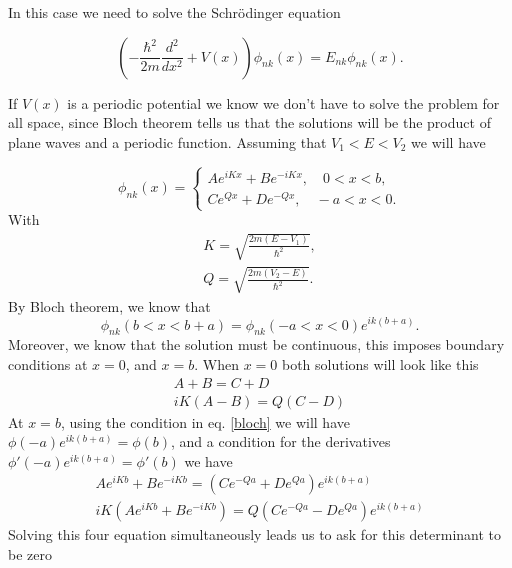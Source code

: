 
\begin{questions}
\begin{solution}
  In this case we need to solve the Schrödinger equation

  \begin{equation}
    \left(-\frac{\hbar^2}{2m}\frac{d^2}{dx^2} + V(x)\right)\phi_{nk}(x) = E_{nk}\phi_{nk}(x).
  \end{equation}

  If $V(x)$ is a periodic potential we know we don't have to solve the problem for all space, since Bloch theorem tells us that the solutions will be the product of plane waves and a periodic function. Assuming that $V_1<E<V_2$ we will have

  \begin{equation}
    \phi_{nk}(x) = \begin{cases}
      Ae^{iKx} + Be^{-iKx}, \quad 0<x<b,\\
      Ce^{Qx} + De^{-Qx}, \quad -a < x < 0.
  \end{cases}
  \end{equation}
  With
  \begin{eqnarray}
    K = \sqrt{\frac{2m(E-V_1)}{\hbar^2}},\\
    Q = \sqrt{\frac{2m(V_2-E)}{\hbar^2}}.
  \end{eqnarray}
  By Bloch theorem, we know that
  \begin{equation}
    \phi_{nk}(b<x<b+a) = \phi_{nk}(-a<x<0)e^{ik(b+a)}.
    \label{bloch}
  \end{equation}
  Moreover, we know that the solution must be continuous, this imposes boundary conditions at $x=0$, and $x=b$.
  When $x=0$ both solutions will look like this
  \begin{eqnarray}
    A+B = C+D\\
    iK(A-B) = Q(C-D)
  \end{eqnarray}
  At $x=b$, using the condition in eq. \ref{bloch} we will have $\phi(-a)e^{ik(b+a)} = \phi(b)$, and a condition for the derivatives $\phi'(-a)e^{ik(b+a)}=\phi'(b)$ we have
  \begin{eqnarray}
    Ae^{iKb} + Be^{-iKb} = \left(Ce^{-Qa} + De^{Qa}\right)e^{ik(b+a)}\\
    iK\left(Ae^{iKb} + Be^{-iKb}\right) = Q\left(Ce^{-Qa} - De^{Qa}\right)e^{ik(b+a)}
  \end{eqnarray}
  Solving this four equation simultaneously leads us to ask for this determinant to be zero
  \begin{equation}

\end{equation}
\end{solution}
\end{questions}
